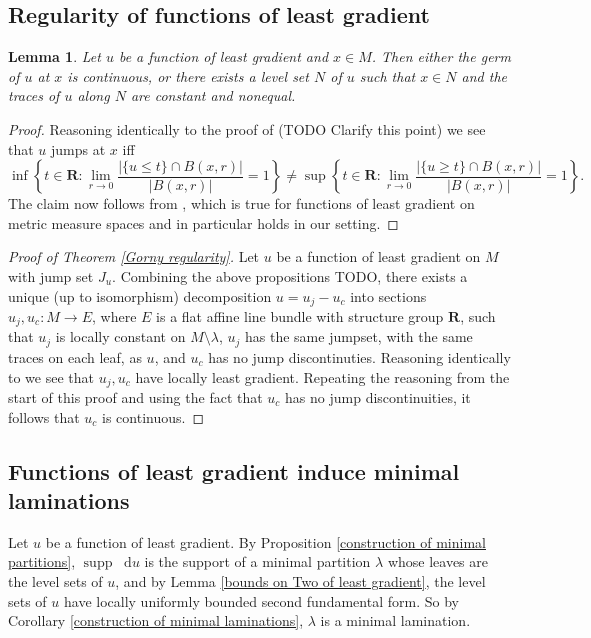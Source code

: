 \documentclass[reqno,10pt]{amsart}
\newcommand{\RR}{\mathbf{R}}
\DeclareMathOperator{\supp}{supp}
\newcommand*\dif{\mathop{}\!\mathrm{d}}
\newtheorem{lemma}[theorem]{Lemma}
\theoremstyle{definition}
\numberwithin{equation}{section}
\begin{document}

\subsection{Regularity of functions of least gradient}
\begin{lemma}
Let $u$ be a function of least gradient and $x \in M$. Then either the germ of $u$ at $x$ is continuous, or there exists a level set $N$ of $u$ such that $x \in N$ and the traces of $u$ along $N$ are constant and nonequal.
\end{lemma}
\begin{proof}
Reasoning identically to the proof of \cite[Proposition 3.9]{górny2017planar} (TODO Clarify this point) we see that $u$ jumps at $x$ iff
$$\inf\left\{t \in \RR: \lim_{r \to 0} \frac{|\{u \leq t\} \cap B(x, r)|}{|B(x, r)|} = 1\right\} \neq \sup\left\{t \in \RR: \lim_{r \to 0} \frac{|\{u \geq t\} \cap B(x, r)|}{|B(x, r)|} = 1\right\}.$$
The claim now follows from \cite[Theorem 4.1]{HakkarainenKorteLahtiShanmugalingam+2015}, which is true for functions of least gradient on metric measure spaces and in particular holds in our setting.
\end{proof}

\begin{proof}[Proof of Theorem \ref{Gorny regularity}]
Let $u$ be a function of least gradient on $M$ with jump set $J_u$.
Combining the above propositions TODO, there exists a unique (up to isomorphism) decomposition $u = u_j - u_c$ into sections $u_j, u_c: M \to E$, where $E$ is a flat affine line bundle with structure group $\RR$, such that $u_j$ is locally constant on $M \setminus \lambda$, $u_j$ has the same jumpset, with the same traces on each leaf, as $u$, and $u_c$ has no jump discontinuties.
Reasoning identically to \cite[pg11]{górny2017planar} we see that $u_j, u_c$ have locally least gradient.
Repeating the reasoning from the start of this proof and using the fact that $u_c$ has no jump discontinuities, it follows that $u_c$ is continuous.
\end{proof}

\subsection{Functions of least gradient induce minimal laminations}
Let $u$ be a function of least gradient.
By Proposition \ref{construction of minimal partitions}, $\supp \dif u$ is the support of a minimal partition $\lambda$ whose leaves are the level sets of $u$, and by Lemma \ref{bounds on Two of least gradient}, the level sets of $u$ have locally uniformly bounded second fundamental form.
So by Corollary \ref{construction of minimal laminations}, $\lambda$ is a minimal lamination.
\end{document}
